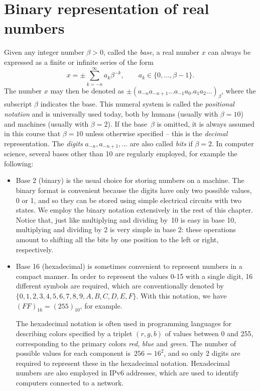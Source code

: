 \section{Binary representation of real numbers}%
\label{sec:binary_representation_of_real_numbers}

Given any integer number $\beta > 0$, called the \emph{base},
a real number $x$ can always be expressed as a finite or infinite series of the form
\begin{equation}
    \label{eq:base_representation}
    x = \pm \sum_{k=-n}^{\infty} a_k \beta^{-k}, \qquad a_k \in \{0, \dotsc, \beta - 1\}.
\end{equation}
The number $x$ may then be denoted as $\pm (a_{-n} a_{-n+1}\dots a_{-1} a_{0}.a_{1} a_{2} \dots)_{\beta}$,
where the subscript $\beta$ indicates the base.
This numeral system is called the \emph{positional notation} and is universally used today,
both by humans (usually with $\beta=10$) and machines (usually with $\beta=2$).
If the base~$\beta$ is omitted,
it is always assumed in this course that $\beta = 10$ unless otherwise specified
-- this is the \emph{decimal} representation.
The \emph{digits} $a_{-n}, a_{-n+1}, \dotsc$ are also called \emph{bits} if $\beta = 2$.
In computer science, several bases other than 10 are regularly employed,
for example the following:
\begin{itemize}
    \item
        Base 2 (binary) is the usual choice for storing numbers on a machine.
        The binary format is convenient because the digits have only two possible values, 0 or 1,
        and so they can be stored using simple electrical circuits with two states.
        We employ the binary notation extensively in the rest of this chapter.
        Notice that, just like multiplying and dividing by~10 is easy in base 10,
        multiplying and dividing by 2 is very simple in base 2:
        these operations amount to shifting all the bits by one position to the left or right,
        respectively.

    \item
        Base 16 (hexadecimal) is sometimes convenient to represent numbers in a compact manner.
        In order to represent the values 0-15 with a single digit,
        16 different symbols are required, which are conventionally denoted by $\{0,1,2,3,4,5,6,7,8,9,A,B,C,D,E,F\}$.
        With this notation, we have $(FF)_{16} = (255)_{10}$, for example.

        The hexadecimal notation is often used in programming languages for describing colors specified by a triplet $(r,g,b)$ of values between 0 and 255,
        corresponding to the primary colors \emph{red}, \emph{blue} and \emph{green}.
        The number of possible values for each component is~$256 = 16^2$,
        and so only 2 digits are required to represent these in the hexadecimal notation.
        Hexadecimal numbers are also employed in IPv6 addresses,
        which are used to identify computers connected to a network.
\end{itemize}

